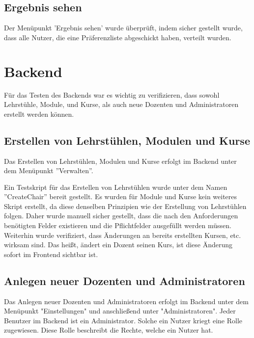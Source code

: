 		\subsection{Ergebnis sehen}
			Der Menüpunkt 'Ergebnis sehen' wurde überprüft, indem sicher gestellt wurde, dass alle Nutzer, die eine Präferenzliste abgeschickt haben, verteilt wurden.\newline
		
	\section{Backend}
	
		Für das Testen des Backends war es wichtig zu verifizieren, dass sowohl Lehrstühle, Module, und Kurse, als auch neue Dozenten und Administratoren erstellt werden können.
		
		\subsection{Erstellen von Lehrstühlen, Modulen und Kurse}
			
			Das Erstellen von Lehrstühlen, Modulen und Kurse erfolgt im Backend unter dem Menüpunkt ''Verwalten''.\newline
			
			Ein Testskript für das Erstellen von Lehrstühlen wurde unter dem Namen ''CreateChair'' bereit gestellt.
			Es wurden für Module und Kurse kein weiteres Skript erstellt, da diese denselben Prinzipien wie der Erstellung von Lehrstühlen folgen.
			Daher wurde manuell sicher gestellt, dass die nach den Anforderungen benötigten Felder existieren und die Pflichtfelder ausgefüllt werden müssen.
			Weiterhin wurde verifiziert, dass Änderungen an bereits erstellten Kursen, etc. wirksam sind.
			Das heißt, ändert ein Dozent seinen Kurs, ist diese Änderung sofort im Frontend sichtbar ist.
			
		\subsection{Anlegen neuer Dozenten und Administratoren}
		
			Das Anlegen neuer Dozenten und Administratoren erfolgt im Backend unter dem Menüpunkt "Einstellungen" und anschließend unter "Administratoren".
			Jeder Benutzer im Backend ist ein Administrator.
			Solche ein Nutzer kriegt eine Rolle zugewiesen.
			Diese Rolle beschreibt die Rechte, welche ein Nutzer hat.\newline
			
